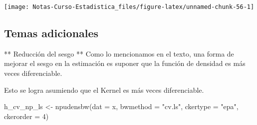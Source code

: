 \documentclass[
  12pt,
]{book}
\newenvironment{Shaded}{\begin{snugshade}}{\end{snugshade}}
\newcommand{\AttributeTok}[1]{\textcolor[rgb]{0.77,0.63,0.00}{#1}}
\newcommand{\DecValTok}[1]{\textcolor[rgb]{0.00,0.00,0.81}{#1}}
\newcommand{\FunctionTok}[1]{\textcolor[rgb]{0.00,0.00,0.00}{#1}}
\newcommand{\NormalTok}[1]{#1}
\newcommand{\OtherTok}[1]{\textcolor[rgb]{0.56,0.35,0.01}{#1}}
\newcommand{\SpecialCharTok}[1]{\textcolor[rgb]{0.00,0.00,0.00}{#1}}
\newcommand{\StringTok}[1]{\textcolor[rgb]{0.31,0.60,0.02}{#1}}
\theoremstyle{definition}
\theoremstyle{definition}
\theoremstyle{definition}
\theoremstyle{definition}
\theoremstyle{remark}
\begin{document}
\begin{Shaded}
\end{Shaded}

\begin{center}\texttt{[image: Notas-Curso-Estadistica\_files/figure-latex/unnamed-chunk-56-1]} \end{center}

\hypertarget{temas-adicionales}{%
\subsection{Temas adicionales}\label{temas-adicionales}}

** Reducción del sesgo ** Como lo mencionamos en el texto, una forma
de mejorar el sesgo en la estimación es suponer que la función de
densidad es más veces diferenciable.

Esto se logra asumiendo que el Kernel es más veces diferenciable.

\begin{Shaded}
\begin{Highlighting}[]
\NormalTok{h\_cv\_np\_ls }\OtherTok{\textless{}{-}} \FunctionTok{npudensbw}\NormalTok{(}\AttributeTok{dat =}\NormalTok{ x, }\AttributeTok{bwmethod =} \StringTok{"cv.ls"}\NormalTok{,}
    \AttributeTok{ckertype =} \StringTok{"epa"}\NormalTok{, }\AttributeTok{ckerorder =} \DecValTok{4}\NormalTok{)}
\end{Highlighting}
\end{Shaded}
\end{document}
